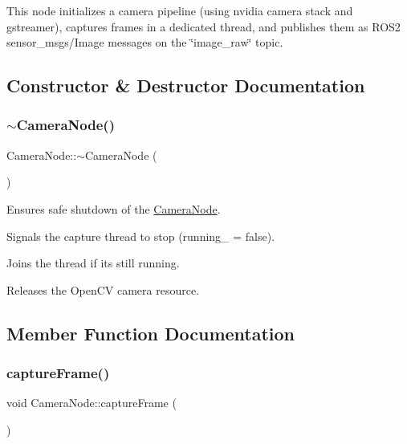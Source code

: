 This node initializes a camera pipeline (using nvidia camera stack and gstreamer), captures frames in a dedicated thread, and publishes them as R\+O\+S2 sensor\+\_\+msgs/\+Image messages on the \char`\"{}image\+\_\+raw\char`\"{} topic. 

\subsection{Constructor \& Destructor Documentation}
\mbox{\label{classCameraNode_ab3a466dc9357b5200fb6843a6d64c5c8}} 
\subsubsection{\texorpdfstring{$\sim$\+Camera\+Node()}{~CameraNode()}}
{\footnotesize\ttfamily Camera\+Node\+::$\sim$\+Camera\+Node (\begin{DoxyParamCaption}{ }\end{DoxyParamCaption})}



Ensures safe shutdown of the \hyperlink{classCameraNode}{Camera\+Node}. 


\begin{DoxyItemize}
\item Signals the capture thread to stop ({\ttfamily running\+\_\+ = false}).
\item Joins the thread if it\textquotesingle{}s still running.
\item Releases the Open\+CV camera resource. 
\end{DoxyItemize}

\subsection{Member Function Documentation}
\mbox{\label{classCameraNode_a1a44c8d8757a75cf649cbcf49cfa1ca1}} 
\subsubsection{\texorpdfstring{capture\+Frame()}{captureFrame()}}
{\footnotesize\ttfamily void Camera\+Node\+::capture\+Frame (\begin{DoxyParamCaption}{ }\end{DoxyParamCaption})\hspace{0.3cm}{\ttfamily [private]}}



